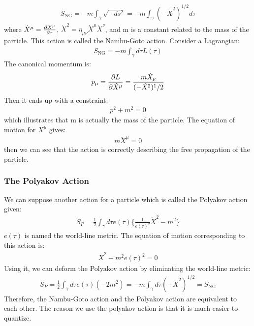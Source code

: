 \begin{align}
    S_{\text{NG}} = -m\int _{\gamma} \sqrt{-ds^{2}} = -m\int _{\gamma} (-\dot{X}^{2})^{1/2} d\tau
\end{align}
where $\dot{X} ^{\mu} = \pdv{X^{\mu}}{\tau}$, $\dot{X} ^{2} = \eta _{\mu \nu} \dot{X}^{\mu} \dot{X} ^{\nu}$, and m is a constant related to the mass of the particle. This action is called the Nambu-Goto action. Consider a Lagrangian:
\begin{align}
    S_{\text{NG}} = -m\int_{\gamma} d\tau L(\tau)
\end{align}
The canonical momentum is:
\begin{align}
    p_{\mu} = \pdv{L}{\dot{X}^{\mu}} = \frac{m\dot{X}_{\mu}}{(-\dot{X}^{2})^1/2}
\end{align}
Then it ends up with a constraint:
\begin{align}
    p^{2} + m^{2} = 0
\end{align}
which illustrates that m is actually the mass of the particle. The equation of motion for $X^{\mu}$ gives:
\begin{align}
    m\ddot{X}^{\mu} =0
\end{align}
then we can see that the action is correctly describing the free propagation of the particle.
\subsubsection{The Polyakov Action}
We can suppose another action for a particle which is called the Polyakov action given:
\begin{align}
    S_{P} = \frac{1}{2} \int _{\gamma} d\tau e(\tau) \lbrace \frac{1}{e(\tau)^{2}} \dot{X}^{2} - m^{2} \rbrace
\end{align}
$e(\tau)$ is named the world-line metric. The equation of motion corresponding to this action is:
\begin{align}
    \dot{X}^{2} + m^{2} e(\tau) ^{2} =0
\end{align}
Using it, we can deform the Polyakov action by eliminating the world-line metric:
\begin{align}
    S_{P} = \frac{1}{2} \int _{\gamma} d\tau e(\tau) (-2m^{2}) = -m \int _{\gamma} d\tau(-\dot{X}^{2})^{1/2} = S_{\text{NG}}
\end{align}
Therefore, the Nambu-Goto action and the Polyakov action are equivalent to each other. The reason we use the polyakov action is that it is much easier to quantize.

